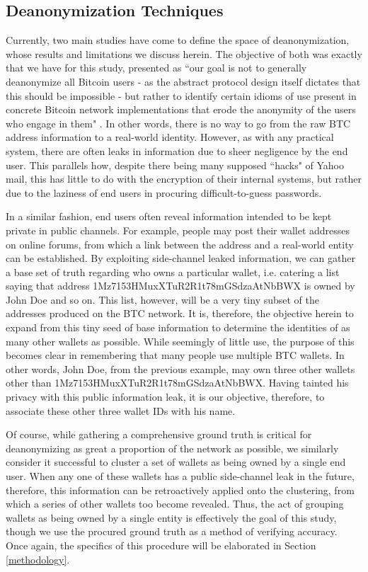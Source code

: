 \documentclass{article}
\begin{document}
\subsection{Deanonymization Techniques}
Currently, two main studies have come to define the space of deanonymization, whose results and limitations we discuss herein. The objective of both was exactly that we have for this study, presented as ``our goal is not to generally deanonymize all Bitcoin users - as the abstract protocol design itself dictates that this should be impossible - but rather to identify certain idioms of use present in concrete Bitcoin network implementations that erode the anonymity of the users who engage in them" \cite{fistful}. In other words, there is no way to go from the raw BTC address information to a real-world identity. However, as with any practical system, there are often leaks in information due to sheer negligence by the end user. This parallels how, despite there being many supposed ``hacks" of Yahoo mail, this has little to do with the encryption of their internal systems, but rather due to the laziness of end users in procuring difficult-to-guess passwords.

In a similar fashion, end users often reveal information intended to be kept private in public channels. For example, people may post their wallet addresses on online forums, from which a link between the address and a real-world entity can be established. By exploiting side-channel leaked information, we can gather a base set of truth regarding who owns a particular wallet, i.e. catering a list saying that address 1Mz7153HMuxXTuR2R1t78mGSdzaAtNbBWX is owned by John Doe and so on. This list, however, will be a very tiny subset of the addresses produced on the BTC network. It is, therefore, the objective herein to expand from this tiny seed of base information to determine the identities of as many other wallets as possible. While seemingly of little use, the purpose of this becomes clear in remembering that many people use multiple BTC wallets. In other words, John Doe, from the previous example, may own three other wallets other than 1Mz7153HMuxXTuR2R1t78mGSdzaAtNbBWX. Having tainted his privacy with this public information leak, it is our objective, therefore, to associate these other three wallet IDs with his name.

Of course, while gathering a comprehensive ground truth is critical for deanonymizing as great a proportion of the network as possible, we similarly consider it successful to cluster a set of wallets as being owned by a single end user. When any one of these wallets has a public side-channel leak in the future, therefore, this information can be retroactively applied onto the clustering, from which a series of other wallets too become revealed. Thus, the act of grouping wallets as being owned by a single entity is effectively the goal of this study, though we use the procured ground truth as a method of verifying accuracy. Once again, the specifics of this procedure will be elaborated in Section \ref{methodology}.
\end{document}
